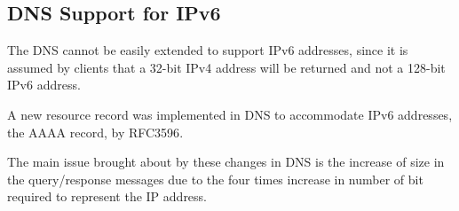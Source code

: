 \documentclass[11pt, a4paper]{article}
\begin{document}
\subsection{DNS Support for IPv6}
\label{subsec:dnsipv6}

The \gls{DNS} cannot be easily extended to support IPv6 addresses, since it is
assumed by clients that a 32-bit IPv4 address will be returned and not a 128-bit
IPv6 address.

A new resource record was implemented in \gls{DNS} to accommodate IPv6 
addresses, the AAAA record, by RFC3596\cite{rfc3596}.

The main issue brought about by these changes in \gls{DNS} is the increase of
size in the query/response messages due to the four times increase in number of
bit required to represent the IP address.



\newpage


\end{document}
